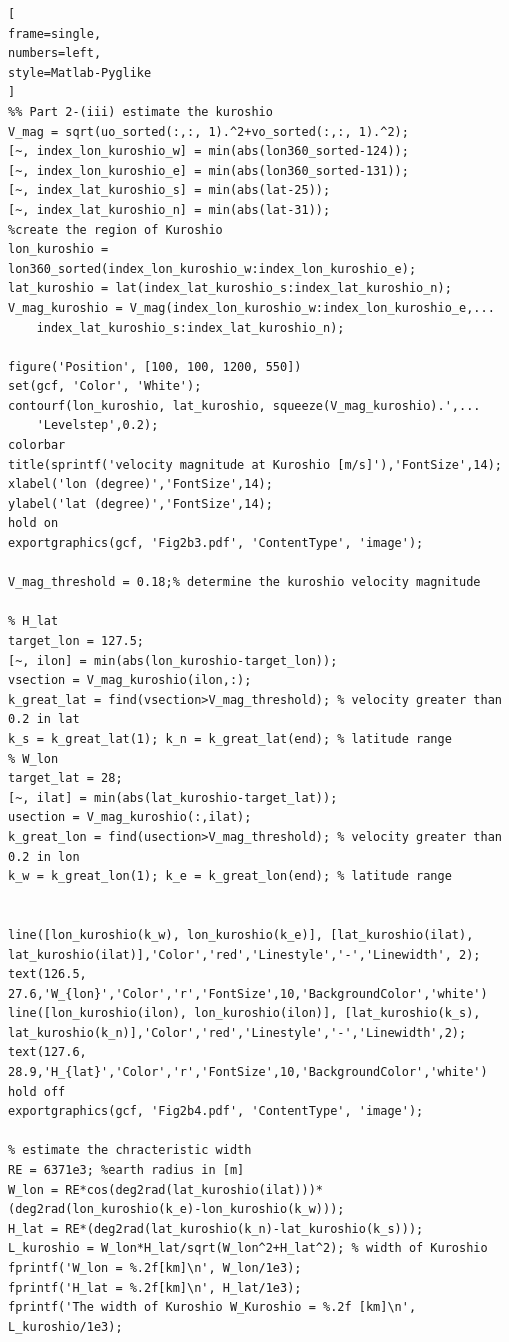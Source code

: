 \documentclass[12pt]{article}
\begin{document}
\begin{CJK*}{UTF8}{bsmi}
\begin{lstlisting}[
frame=single,
numbers=left,
style=Matlab-Pyglike
]
%% Part 2-(iii) estimate the kuroshio
V_mag = sqrt(uo_sorted(:,:, 1).^2+vo_sorted(:,:, 1).^2);
[~, index_lon_kuroshio_w] = min(abs(lon360_sorted-124));
[~, index_lon_kuroshio_e] = min(abs(lon360_sorted-131));
[~, index_lat_kuroshio_s] = min(abs(lat-25));
[~, index_lat_kuroshio_n] = min(abs(lat-31));
%create the region of Kuroshio
lon_kuroshio = lon360_sorted(index_lon_kuroshio_w:index_lon_kuroshio_e);
lat_kuroshio = lat(index_lat_kuroshio_s:index_lat_kuroshio_n);
V_mag_kuroshio = V_mag(index_lon_kuroshio_w:index_lon_kuroshio_e,...
    index_lat_kuroshio_s:index_lat_kuroshio_n);

figure('Position', [100, 100, 1200, 550])
set(gcf, 'Color', 'White');
contourf(lon_kuroshio, lat_kuroshio, squeeze(V_mag_kuroshio).',...
    'Levelstep',0.2);
colorbar
title(sprintf('velocity magnitude at Kuroshio [m/s]'),'FontSize',14);
xlabel('lon (degree)','FontSize',14);
ylabel('lat (degree)','FontSize',14);
hold on
exportgraphics(gcf, 'Fig2b3.pdf', 'ContentType', 'image');

V_mag_threshold = 0.18;% determine the kuroshio velocity magnitude

% H_lat
target_lon = 127.5;
[~, ilon] = min(abs(lon_kuroshio-target_lon));
vsection = V_mag_kuroshio(ilon,:);
k_great_lat = find(vsection>V_mag_threshold); % velocity greater than 0.2 in lat
k_s = k_great_lat(1); k_n = k_great_lat(end); % latitude range
% W_lon
target_lat = 28;
[~, ilat] = min(abs(lat_kuroshio-target_lat));
usection = V_mag_kuroshio(:,ilat);
k_great_lon = find(usection>V_mag_threshold); % velocity greater than 0.2 in lon
k_w = k_great_lon(1); k_e = k_great_lon(end); % latitude range


line([lon_kuroshio(k_w), lon_kuroshio(k_e)], [lat_kuroshio(ilat), lat_kuroshio(ilat)],'Color','red','Linestyle','-','Linewidth', 2);
text(126.5, 27.6,'W_{lon}','Color','r','FontSize',10,'BackgroundColor','white')
line([lon_kuroshio(ilon), lon_kuroshio(ilon)], [lat_kuroshio(k_s), lat_kuroshio(k_n)],'Color','red','Linestyle','-','Linewidth',2);
text(127.6, 28.9,'H_{lat}','Color','r','FontSize',10,'BackgroundColor','white')
hold off
exportgraphics(gcf, 'Fig2b4.pdf', 'ContentType', 'image');

% estimate the chracteristic width
RE = 6371e3; %earth radius in [m]
W_lon = RE*cos(deg2rad(lat_kuroshio(ilat)))*(deg2rad(lon_kuroshio(k_e)-lon_kuroshio(k_w)));
H_lat = RE*(deg2rad(lat_kuroshio(k_n)-lat_kuroshio(k_s)));
L_kuroshio = W_lon*H_lat/sqrt(W_lon^2+H_lat^2); % width of Kuroshio
fprintf('W_lon = %.2f[km]\n', W_lon/1e3);
fprintf('H_lat = %.2f[km]\n', H_lat/1e3);
fprintf('The width of Kuroshio W_Kuroshio = %.2f [km]\n', L_kuroshio/1e3);


\end{lstlisting}
\end{CJK*}
\end{document}
